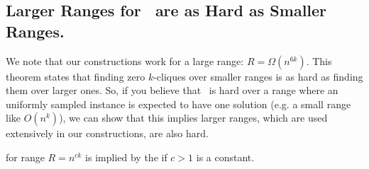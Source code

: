 \subsection{Larger Ranges for \zkclique~are as Hard as Smaller Ranges.}
We note that our constructions work for a large range: $R = \Omega(n^{6k})$. This theorem states that finding zero $k$-cliques over smaller ranges is as hard as finding them over larger ones.
So, if you believe that \zkclique~is hard over a range where an uniformly sampled instance is expected to have one solution (e.g. a small range like $O(n^k)$), we can show that this implies larger ranges, which are used extensively in our constructions, are also hard.

\begin{theorem}
	\Strongzkc for range $R=n^{c k}$ is implied by the \RandomZKC if $c>1$ is a constant.
	\label{thm:rangeExtendThm}
\end{theorem}
